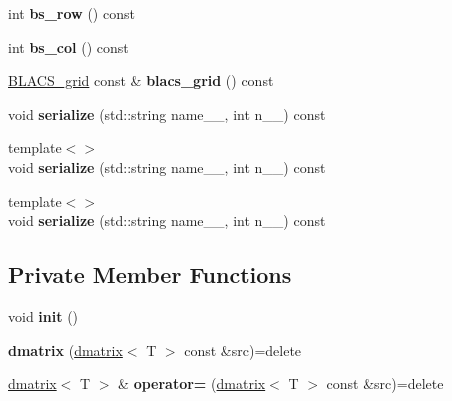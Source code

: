 \begin{DoxyCompactItemize}
\item 
\hypertarget{classsddk_1_1dmatrix_af40a2cb79dc2cab8bbe2144c1c782dec}{}int {\bfseries bs\+\_\+row} () const \label{classsddk_1_1dmatrix_af40a2cb79dc2cab8bbe2144c1c782dec}

\item 
\hypertarget{classsddk_1_1dmatrix_a5f0bc9c077070af233691e95e575580e}{}int {\bfseries bs\+\_\+col} () const \label{classsddk_1_1dmatrix_a5f0bc9c077070af233691e95e575580e}

\item 
\hypertarget{classsddk_1_1dmatrix_a4f081f64edb03c8d1a7371bed86921b8}{}\hyperlink{classsddk_1_1_b_l_a_c_s__grid}{B\+L\+A\+C\+S\+\_\+grid} const \& {\bfseries blacs\+\_\+grid} () const \label{classsddk_1_1dmatrix_a4f081f64edb03c8d1a7371bed86921b8}

\item 
\hypertarget{classsddk_1_1dmatrix_a89058b8ec1e185ac53543a99dedd0a58}{}void {\bfseries serialize} (std\+::string name\+\_\+\+\_\+, int n\+\_\+\+\_\+) const \label{classsddk_1_1dmatrix_a89058b8ec1e185ac53543a99dedd0a58}

\item 
\hypertarget{classsddk_1_1dmatrix_ac6e3e007833101fd479ec8c620c251be}{}{\footnotesize template$<$$>$ }\\void {\bfseries serialize} (std\+::string name\+\_\+\+\_\+, int n\+\_\+\+\_\+) const\label{classsddk_1_1dmatrix_ac6e3e007833101fd479ec8c620c251be}

\item 
\hypertarget{classsddk_1_1dmatrix_ab9bef0b2de721281b56602a6bd49aa5f}{}{\footnotesize template$<$$>$ }\\void {\bfseries serialize} (std\+::string name\+\_\+\+\_\+, int n\+\_\+\+\_\+) const\label{classsddk_1_1dmatrix_ab9bef0b2de721281b56602a6bd49aa5f}

\end{DoxyCompactItemize}
\subsection*{Private Member Functions}
\begin{DoxyCompactItemize}
\item 
\hypertarget{classsddk_1_1dmatrix_a2699eaa0d5b724dcf6861e0d5584281c}{}void {\bfseries init} ()\label{classsddk_1_1dmatrix_a2699eaa0d5b724dcf6861e0d5584281c}

\item 
\hypertarget{classsddk_1_1dmatrix_a9d46ba8ced231d1af7a37b96e1cdfa73}{}{\bfseries dmatrix} (\hyperlink{classsddk_1_1dmatrix}{dmatrix}$<$ T $>$ const \&src)=delete\label{classsddk_1_1dmatrix_a9d46ba8ced231d1af7a37b96e1cdfa73}

\item 
\hypertarget{classsddk_1_1dmatrix_a265988b4d7c64be61cd4478840aa7367}{}\hyperlink{classsddk_1_1dmatrix}{dmatrix}$<$ T $>$ \& {\bfseries operator=} (\hyperlink{classsddk_1_1dmatrix}{dmatrix}$<$ T $>$ const \&src)=delete\label{classsddk_1_1dmatrix_a265988b4d7c64be61cd4478840aa7367}

\end{DoxyCompactItemize}

